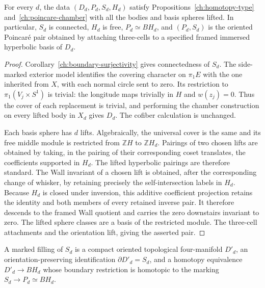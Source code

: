 \begin{lemma}
\label{ch:cover-data}
For every $d$, the data $(D_d,P_d,S_d,H_d)$ satisfy
Propositions~\ref{ch:homotopy-type} and~\ref{ch:poincare-chamber}
with all the bodies and basis spheres lifted.  In particular,
$S_d$ is connected, $H_d$ is free, $P_d\simeq BH_d$, and
$(P_d,S_d)$ is the oriented Poincar\'e pair obtained by
attaching three-cells to a specified framed immersed
hyperbolic basis of $D_d$.
\end{lemma}

\begin{proof}
Corollary~\ref{ch:boundary-surjectivity} gives connectedness
of $S_d$.  The side-marked exterior model identifies the
covering character on $\pi_1E$ with the one inherited from
$X$, with each normal circle sent to zero.  Its restriction
to $\pi_1(V_j\times S^1)$ is trivial: the longitude maps
trivially in $H$ and $w(z_j)=0$.  Thus the cover of each
replacement is trivial, and performing the chamber
construction on every lifted body in $X_d$ gives $D_d$.
The cofiber calculation is unchanged.

Each basis sphere has $d$ lifts.  Algebraically, the universal
cover is the same and its free middle module is restricted
from $\mathbb ZH$ to $\mathbb ZH_d$.  Pairings of two
chosen lifts are obtained by taking, in the pairing of their
corresponding coset translates, the coefficients supported
in $H_d$.  The lifted hyperbolic pairings are therefore standard.
The Wall invariant of a chosen lift is obtained, after the corresponding
change of whisker, by retaining precisely the self-intersection labels
in $H_d$.  Because $H_d$ is closed under inversion, this additive
coefficient projection retains the identity and both members of every
retained inverse pair.  It therefore descends to the framed Wall
quotient and carries the zero downstairs invariant to zero.
The lifted sphere classes are a basis of the
restricted module.  The three-cell attachments and the
orientation lift, giving the asserted pair.
\end{proof}

\begin{definition}
\label{ch:marked-filling}
A marked filling of $S_d$ is a compact oriented topological
four-manifold $D'_d$, an orientation-preserving identification
$\partial D'_d=S_d$, and a homotopy equivalence
$D'_d\to BH_d$ whose boundary restriction is homotopic to
the marking $S_d\to P_d\simeq BH_d$.
\end{definition}

